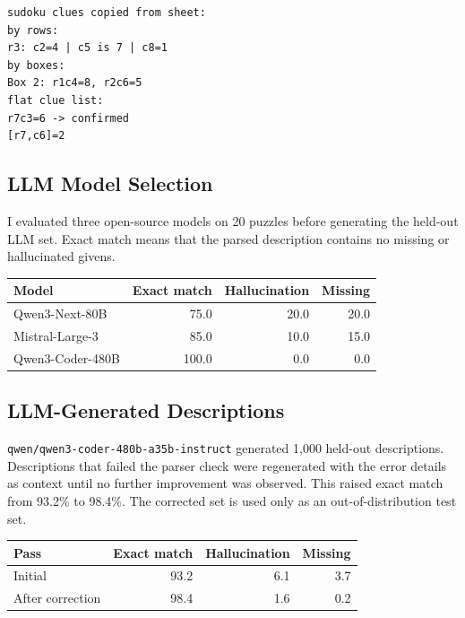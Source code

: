 \documentclass[11pt]{article}
\begin{document}
\begin{verbatim}
sudoku clues copied from sheet:
by rows:
r3: c2=4 | c5 is 7 | c8=1
by boxes:
Box 2: r1c4=8, r2c6=5
flat clue list:
r7c3=6 -> confirmed
[r7,c6]=2
\end{verbatim}

\subsection{LLM Model Selection}
\label{app:llm_model_selection}

I evaluated three open-source models on 20 puzzles before generating the held-out LLM set.
Exact match means that the parsed description contains no missing or hallucinated givens.

\begin{center}
\begin{minipage}{0.98\linewidth}
\scriptsize
\setlength{\tabcolsep}{2pt}
\label{tab:app_llm_model_selection}
\begin{tabular}{@{}lrrr@{}}
\toprule
Model & Exact match & Hallucination & Missing \\
\midrule
Qwen3-Next-80B & 75.0 & 20.0 & 20.0 \\
Mistral-Large-3 & 85.0 & 10.0 & 15.0 \\
Qwen3-Coder-480B & 100.0 & 0.0 & 0.0 \\
\bottomrule
\end{tabular}
\end{minipage}
\end{center}

\subsection{LLM-Generated Descriptions}
\label{app:nl_llm}
\label{app:llm_nl_generation}

\texttt{qwen/qwen3-coder-480b-a35b-instruct} generated 1,000 held-out descriptions.
Descriptions that failed the parser check were regenerated with the error details as context until no further improvement was observed.
This raised exact match from 93.2\% to 98.4\%.
The corrected set is used only as an out-of-distribution test set.

\begin{center}
\begin{minipage}{0.98\linewidth}
\scriptsize
\setlength{\tabcolsep}{2pt}
\label{tab:app_llm_correction}
\begin{tabular}{@{}lrrr@{}}
\toprule
Pass & Exact match & Hallucination & Missing \\
\midrule
Initial & 93.2 & 6.1 & 3.7 \\
After correction & 98.4 & 1.6 & 0.2 \\
\bottomrule
\end{tabular}
\end{minipage}
\end{center}
\end{document}
